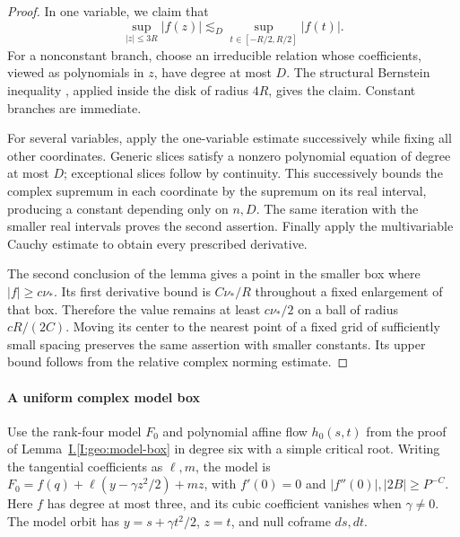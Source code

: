 \documentclass[11pt]{amsart}
\theoremstyle{definition}
\theoremstyle{remark}
\numberwithin{equation}{section}
\newcommand{\partIref}[1]{\hyperref[I:#1]{I.\ref*{I:#1}}}
\begin{document}
\begin{proof}
In one variable, we claim that
\[
\sup_{|z|\le3R}|f(z)|\lesssim_D \sup_{t\in[-R/2,R/2]}|f(t)|.
\]
For a nonconstant branch, choose an irreducible relation whose coefficients, viewed as polynomials in $z$, have degree at most $D$. The structural Bernstein inequality \cite[Corollary~3.3.2 and Proposition~2.1.5]{RoytwarfYomdin}, applied inside the disk of radius $4R$, gives the claim. Constant branches are immediate.

For several variables, apply the one-variable estimate successively while fixing all other coordinates. Generic slices satisfy a nonzero polynomial equation of degree at most $D$; exceptional slices follow by continuity. This successively bounds the complex supremum in each coordinate by the supremum on its real interval, producing a constant depending only on $n,D$. The same iteration with the smaller real intervals proves the second assertion. Finally apply the multivariable Cauchy estimate to obtain every prescribed derivative.

The second conclusion of the lemma gives a point in the smaller box where $|f|\ge c\nu_*$. Its first derivative bound is $C\nu_*/R$ throughout a fixed enlargement of that box. Therefore the value remains at least $c\nu_*/2$ on a ball of radius $cR/(2C)$. Moving its center to the nearest point of a fixed grid of sufficiently small spacing preserves the same assertion with smaller constants. Its upper bound follows from the relative complex norming estimate. 
\end{proof}

\paragraph{A uniform complex model box}

Use the rank-four model $F_0$ and polynomial affine flow $h_0(s,t)$ from the proof of Lemma~\partIref{geo:model-box} in degree six with a simple critical root. Writing the tangential coefficients as $\ell,m$, the model is $F_0=f(q)+\ell(y-\gamma z^2/2)+mz$, with $f'(0)=0$ and $|f''(0)|,|2B|\ge P^{-C}$. Here $f$ has degree at most three, and its cubic coefficient vanishes when $\gamma\ne0$. The model orbit has $y=s+\gamma t^2/2$, $z=t$, and null coframe $ds,dt$.
\end{document}
